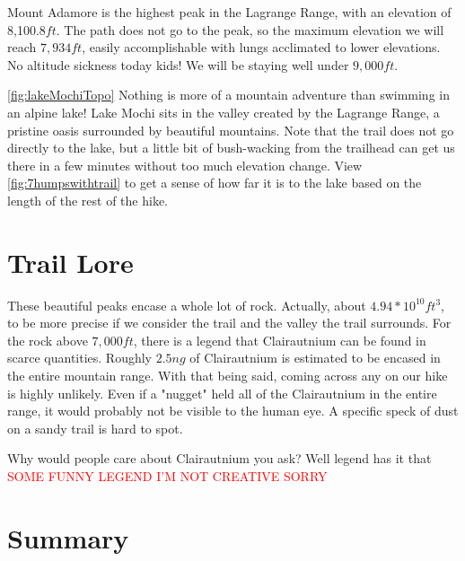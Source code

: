 \documentclass[12pt]{article}   %
\theoremstyle{definition}
\numberwithin{equation}{section}
\begin{document}
\quad Mount Adamore is the highest peak in the Lagrange Range, with an elevation of 8,100.8$ft$. The path does not go to the peak, so the maximum elevation we will reach $7,934ft$, easily accomplishable with lungs acclimated to lower elevations. No altitude sickness today kids! We will be staying well under $9,000ft$.





\quad \autoref{fig:lakeMochiTopo} Nothing is more of a mountain adventure than swimming in an alpine lake! Lake Mochi sits in the valley created by the Lagrange Range, a pristine oasis surrounded by beautiful mountains. Note that the trail does not go directly to the lake, but a little bit of bush-wacking from the trailhead can get us there in a few minutes without too much elevation change. View \autoref{fig:7humpswithtrail} to get a sense of how far it is to the lake based on the length of the rest of the hike.
\section{Trail Lore} \label{APPM2350proj02sec05}

\quad These beautiful peaks encase a whole lot of rock. Actually, about $4.94*10^{10}ft^3$, to be more precise if we consider the trail and the valley the trail surrounds. For the rock above $7,000ft$, there is a legend that Clairautnium can be found in scarce quantities. Roughly $2.5ng$ of Clairautnium is estimated to be encased in the entire mountain range. With that being said, coming across any on our hike is highly unlikely. Even if a "nugget" held all of the Clairautnium in the entire range, it would probably not be visible to the human eye. A specific speck of dust on a sandy trail is hard to spot.

\quad Why would people care about Clairautnium you ask? Well legend has it that \textcolor{red}{SOME FUNNY LEGEND I'M NOT CREATIVE SORRY}
\section{Summary} \label{APPM2350proj02sec06}
\end{document}
